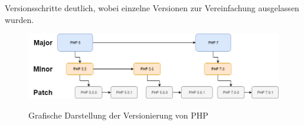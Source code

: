 Versionsschritte deutlich, wobei einzelne Versionen zur Vereinfachung ausgelassen wurden.
\begin{figure}[bth]
    \myfloatalign
    {\includegraphics[width=1\linewidth]{gfx/semVer}} \quad
    \caption[Grafische Darstellung der Versionierung von PHP]{Grafische Darstellung der Versionierung von \acs{PHP}}\label{fig:semVer}
\end{figure}
